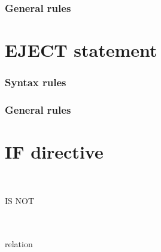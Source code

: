 \subsubsection{General rules}

\section{EJECT statement}

\begin{syntax}
\end{syntax}

\subsubsection{Syntax rules}

\subsubsection{General rules}

\section{IF directive}

\begin{syntax}
  \begin{1=}
    \directiveindicator \\
    \miscext{\textdollar}
  \end{1=}
    IS NOT
  \begin{1=}
     \\
     \\
    relation \\
  \end{1=}

  \sourcetext


  \begin{0-1}
    \begin{1=}
      \directiveindicator \\
      \miscext{\textdollar}
    \end{1=}
     \sourcetext
  \end{0-1}

  \begin{0-1}
    \directiveindicator{} \\
  \end{0-1}
\end{syntax}

